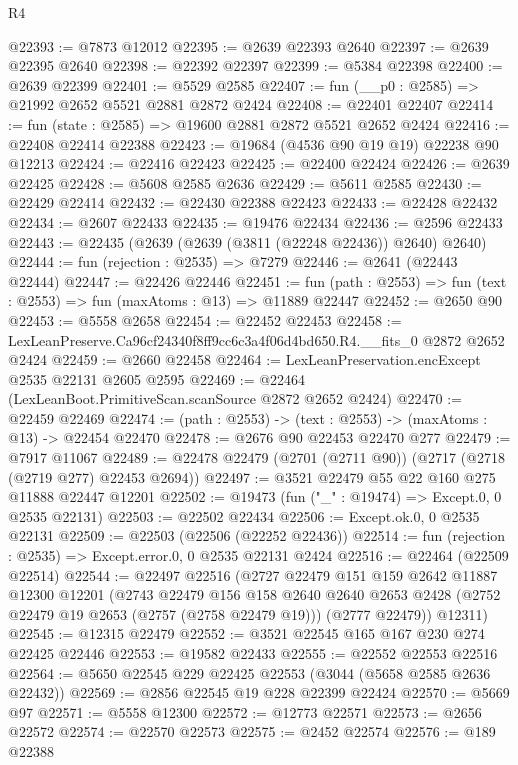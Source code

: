\begin{lexlean}{R4}
\begin{coremodule}
@22393 := @7873 @12012
@22395 := @2639 @22393 @2640
@22397 := @2639 @22395 @2640
@22398 := @22392 @22397
@22399 := @5384 @22398
@22400 := @2639 @22399
@22401 := @5529 @2585
@22407 := fun (__p0 : @2585) => @21992 @2652 @5521 @2881 @2872 @2424
@22408 := @22401 @22407
@22414 := fun (state : @2585) => @19600 @2881 @2872 @5521 @2652 @2424
@22416 := @22408 @22414 @22388
@22423 := @19684 (@4536 @90 @19 @19) @22238 @90 @12213
@22424 := @22416 @22423
@22425 := @22400 @22424
@22426 := @2639 @22425
@22428 := @5608 @2585 @2636
@22429 := @5611 @2585
@22430 := @22429 @22414
@22432 := @22430 @22388 @22423
@22433 := @22428 @22432
@22434 := @2607 @22433
@22435 := @19476 @22434
@22436 := @2596 @22433
@22443 := @22435 (@2639 (@2639 (@3811 (@22248 @22436)) @2640) @2640)
@22444 := fun (rejection : @2535) => @7279
@22446 := @2641 (@22443 @22444)
@22447 := @22426 @22446
@22451 := fun (path : @2553) => fun (text : @2553) => fun (maxAtoms : @13) => @11889 @22447
@22452 := @2650 @90
@22453 := @5558 @2658
@22454 := @22452 @22453
@22458 := LexLeanPreserve.Ca96cf24340f8ff9cc6c3a4f06d4bd650.R4.__fits_0 @2872 @2652 @2424
@22459 := @2660 @22458
@22464 := LexLeanPreservation.encExcept @2535 @22131 @2605 @2595
@22469 := @22464 (LexLeanBoot.PrimitiveScan.scanSource @2872 @2652 @2424)
@22470 := @22459 @22469
@22474 := (path : @2553) -> (text : @2553) -> (maxAtoms : @13) -> @22454 @22470
@22478 := @2676 @90 @22453 @22470 @277
@22479 := @7917 @11067
@22489 := @22478 @22479 (@2701 (@2711 @90)) (@2717 (@2718 (@2719 @277) @22453 @2694))
@22497 := @3521 @22479 @55 @22 @160 @275 @11888 @22447 @12201
@22502 := @19473 (fun ("_" : @19474) => Except.{0, 0} @2535 @22131)
@22503 := @22502 @22434
@22506 := Except.ok.{0, 0} @2535 @22131
@22509 := @22503 (@22506 (@22252 @22436))
@22514 := fun (rejection : @2535) => Except.error.{0, 0} @2535 @22131 @2424
@22516 := @22464 (@22509 @22514)
@22544 := @22497
    @22516
    (@2727
      @22479
      @151
      @159
      @2642
      @11887
      @12300
      @12201
      (@2743
        @22479
        @156
        @158
        @2640
        @2640
        @2653
        @2428
        (@2752 @22479 @19 @2653 (@2757 (@2758 @22479 @19)))
        (@2777 @22479))
      @12311)
@22545 := @12315 @22479
@22552 := @3521 @22545 @165 @167 @230 @274 @22425 @22446
@22553 := @19582 @22433
@22555 := @22552 @22553 @22516
@22564 := @5650 @22545 @229 @22425 @22553 (@3044 (@5658 @2585 @2636 @22432))
@22569 := @2856 @22545 @19 @228 @22399 @22424
@22570 := @5669 @97
@22571 := @5558 @12300
@22572 := @12773 @22571
@22573 := @2656 @22572
@22574 := @22570 @22573
@22575 := @2452 @22574
@22576 := @189 @22388

\end{coremodule}
\end{lexlean}
